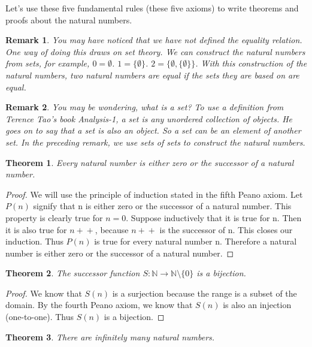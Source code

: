 \documentclass{article}
\newtheorem{theorem}{Theorem}
\newtheorem{remark}{Remark}
\newcommand{\inc}[1]{\mathrel{{{#1}+}+}}
\begin{document}
Let's use these five fundamental rules (these five axioms) to write theorems and proofs about the natural numbers. 

\begin{remark}
You may have noticed that we have not defined the equality relation. One way of doing this draws on set theory. We can construct the natural numbers from sets, for example, $0 = \emptyset$. $1 = \{\emptyset\}$. $2 = \{\emptyset, \{\emptyset\}\}$. With this construction of the natural numbers, two natural numbers are equal if the sets they are based on are equal. 
\end{remark}

\begin{remark}
You may be wondering, what is a set? To use a definition from Terence Tao's book Analysis-1, a set is any unordered collection of objects. He goes on to say that a set is also an object. So a set can be an element of another set. In the preceding remark, we use sets of sets to construct the natural numbers.
\end{remark}

\begin{theorem}
Every natural number is either zero or the successor of a natural number.
\end{theorem}

\begin{proof}
We will use the principle of induction stated in the fifth Peano axiom. Let $P(n)$ signify that n is either zero or the successor of a natural number. This property is clearly true for $n = 0$. Suppose inductively that it is true for n. Then it is also true for $\inc{n}$, because $\inc{n}$ is the successor of n. This closes our induction. Thus $P(n)$ is true for every natural number n. Therefore a natural number is either zero or the successor of a natural number.
\end{proof}

\begin{theorem}
The successor function $S : \mathbb{N} \to \mathbb{N}\setminus\{0\}$ is a bijection.
\end{theorem}

\begin{proof}
We know that $S(n)$ is a surjection because the range is a subset of the domain. By the fourth Peano axiom, we know that $S(n)$ is also an injection (one-to-one). Thus $S(n)$ is a bijection.
\end{proof}

\begin{theorem}
There are infinitely many natural numbers. 
\end{theorem}
\end{document}
